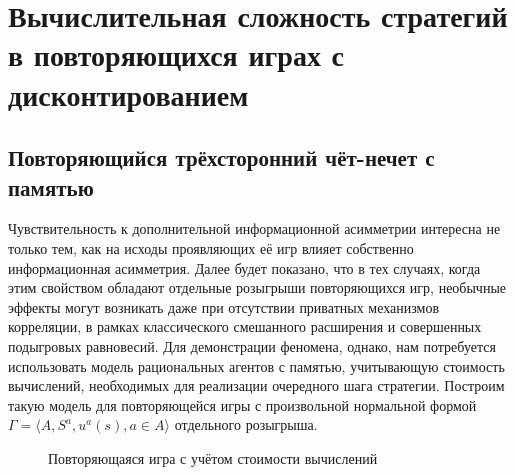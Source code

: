 \chapter{Вычислительная сложность стратегий в повторяющихся играх с дисконтированием}\label{ch:ch3}

\section{Повторяющийся трёхсторонний чёт-нечет с памятью}\label{sec:ch3/sect1}

Чувствительность к дополнительной информационной асимметрии интересна не только тем, как на исходы проявляющих её игр влияет собственно информационная асимметрия. Далее будет показано, что в тех случаях, когда этим свойством обладают отдельные розыгрыши повторяющихся игр, необычные эффекты могут возникать даже при отсутствии приватных механизмов корреляции, в рамках классического смешанного расширения и совершенных подыгровых равновесий. Для демонстрации феномена, однако, нам потребуется использовать модель рациональных агентов с памятью, учитывающую стоимость вычислений, необходимых для реализации очередного шага стратегии. Построим такую модель для повторяющейся игры с произвольной нормальной формой $\Gamma = \langle A, S^a, u^a(s), a \in A \rangle$ отдельного розыгрыша.
\begin{figure}[ht]
	\legend{}
	\caption[Повторяющаяся игра с учётом стоимости вычислений]{Повторяющаяся игра с учётом стоимости вычислений}\label{fig:repeat}
\end{figure}



\clearpage
